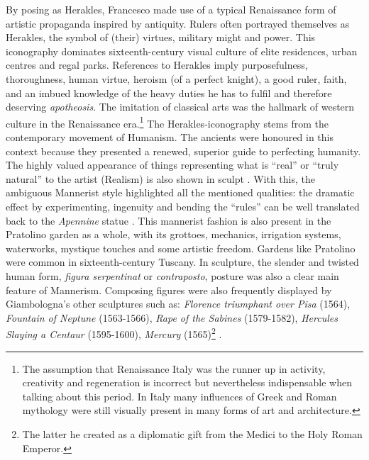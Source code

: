 By posing as Herakles, Francesco made use of a typical Renaissance form of artistic propaganda inspired by antiquity. Rulers often portrayed themselves as Herakles, the symbol of (their) virtues, military might and power. This iconography dominates sixteenth-century visual culture of elite residences, urban centres and regal parks. References to Herakles imply purposefulness, thoroughness, human virtue, heroism (of a perfect knight), a good ruler, faith, and an imbued knowledge of the heavy duties he has to fulfil and therefore deserving \textit{apotheosis}. The imitation of classical arts was the hallmark of western culture in the Renaissance era.\footnote{The assumption that Renaissance Italy was the runner up in activity, creativity and regeneration is incorrect but nevertheless indispensable when talking about this period. In Italy many influences of Greek and Roman mythology were still visually present in many forms of art and architecture.}  The Herakles-iconography stems from the contemporary movement of Humanism. The ancients were honoured in this context because they presented a renewed, superior guide to perfecting humanity. The highly valued appearance of things representing what is “real” or “truly natural” to the artist (Realism) is also shown in sculpt  \parencites[7,13,16,23-24,39,43]{Burke1989}[56]{Goldthwaite2009}[250]{Najemy2006}[211,213-218]{Moormann2007}. With this, the ambiguous Mannerist style highlighted all the mentioned qualities: the dramatic effect by experimenting, ingenuity and bending the “rules” can be well translated back to the \textit{Apennine} statue \parencites[69,71-72]{Burke1989}[396]{Goldthwaite2009}. This mannerist fashion is also present in the Pratolino garden as a whole, with its grottoes, mechanics, irrigation systems, waterworks, mystique touches and some artistic freedom. Gardens like Pratolino were common in sixteenth-century Tuscany. In sculpture, the slender and twisted human form, \textit{figura serpentinat} or \textit{contraposto}, posture was also a clear main feature of Mannerism. Composing figures were also frequently displayed by Giambologna’s other sculptures such as: \textit{Florence triumphant over Pisa} (1564), \textit{Fountain of Neptune} (1563-1566), \textit{Rape of the Sabines} (1579-1582), \textit{Hercules Slaying a Centaur} (1595-1600), \textit{Mercury} (1565)\footnote{The latter he created as a diplomatic gift from the Medici to the Holy Roman Emperor.} \parencites[42-44]{Burke1989}[155,161,163]{Smith1961}[34-36]{Dhanens1956}[200]{Partridge2009}[XI-XII]{Hall1998}.

